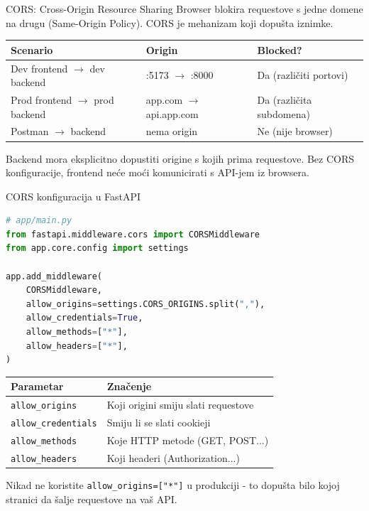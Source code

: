\begin{frame}{CORS: Cross-Origin Resource Sharing}
Browser blokira requestove s jedne domene na drugu (Same-Origin Policy). CORS je mehanizam koji dopušta iznimke.

\vspace{0.4em}
\begin{tabular}{@{}lll@{}}
  \toprule
  \textbf{Scenario} & \textbf{Origin} & \textbf{Blocked?} \\
  \midrule
  Dev frontend $\rightarrow$ dev backend & :5173 $\rightarrow$ :8000 & Da (različiti portovi) \\
  Prod frontend $\rightarrow$ prod backend & app.com $\rightarrow$ api.app.com & Da (različita subdomena) \\
  Postman $\rightarrow$ backend & nema origin & Ne (nije browser) \\
  \bottomrule
\end{tabular}

\vspace{0.6em}
Backend mora eksplicitno dopustiti origine s kojih prima requestove. Bez CORS konfiguracije, frontend neće moći komunicirati s API-jem iz browsera.
\end{frame}

\begin{frame}[fragile,shrink=5]{CORS konfiguracija u FastAPI}
\begin{lstlisting}[language=python]
# app/main.py
from fastapi.middleware.cors import CORSMiddleware
from app.core.config import settings

app.add_middleware(
    CORSMiddleware,
    allow_origins=settings.CORS_ORIGINS.split(","),
    allow_credentials=True,
    allow_methods=["*"],
    allow_headers=["*"],
)
\end{lstlisting}

\vspace{0.4em}
\begin{tabular}{@{}ll@{}}
  \toprule
  \textbf{Parametar} & \textbf{Značenje} \\
  \midrule
  \texttt{allow\_origins} & Koji origini smiju slati requestove \\
  \texttt{allow\_credentials} & Smiju li se slati cookieji \\
  \texttt{allow\_methods} & Koje HTTP metode (GET, POST...) \\
  \texttt{allow\_headers} & Koji headeri (Authorization...) \\
  \bottomrule
\end{tabular}

\vspace{0.4em}
Nikad ne koristite \texttt{allow\_origins=["*"]} u produkciji - to dopušta bilo kojoj stranici da šalje requestove na vaš API.
\end{frame}


